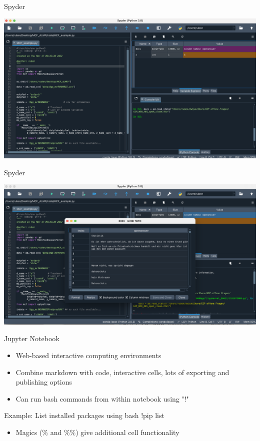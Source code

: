 \documentclass[10pt, aspectratio=169]{beamer}
\begin{document}
{\begin{frame}{Spyder}
    \begin{center}
      \includegraphics[scale=.28]{Day 1/Slides/LaTeX files/Spyder.png} \\
     \end{center}
\end{frame}

\begin{frame}{Spyder}
    \begin{center}
      \includegraphics[scale=.28]{Day 1/Slides/LaTeX files/Spyder-2.png} \\
     \end{center}
\end{frame}

\begin{frame}{Jupyter Notebook}
    \small
    \begin{itemize}
        \item Web-based interactive computing environments
        \item Combine markdown with code, interactive cells, lots of exporting and publishing options
        \item Can run bash commands from within notebook using "!"
    \end{itemize}
    \begin{block}{Example: List installed packages using bash}
        !pip list
    \end{block}
    \begin{itemize}
        \item Magics (\% and \%\%) give additional cell functionality 
    \end{itemize}       


\end{frame}}
\end{document}
